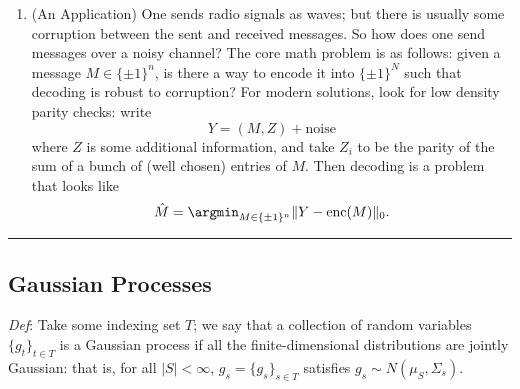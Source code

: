 \begin{enumerate}
  \(A \in \mathbb R^{N \times N}\) with
  \(A_{ij} \sim \mathrm{Ber}(1/2)\), \(A_{ii} = 1\). Then we might ask
  about \[
   \mathbb E \max \{|S| \mid S \subset [N], A_{SS} = \mathbf 1 \}
  \] which we call the largest clique problem (think of \(A\) as a
  random adjacency matrix for a graph). Further, we might care about
  limitations on ``compute'': what can we do in polynomial time?
\item
  (An Application) One sends radio signals as waves; but there is
  usually some corruption between the sent and received messages. So how
  does one send messages over a noisy channel? The core math problem is
  as follows: given a message \(M \in \{\pm 1\}^{n}\), is there a way to
  encode it into \(\{\pm 1\}^{N}\) such that decoding is robust to
  corruption? For modern solutions, look for low density parity checks:
  write \[
   Y = (M, Z) + \mathrm{ noise}
  \] where \(Z\) is some additional information, and take \(Z_{i}\) to
  be the parity of the sum of a bunch of (well chosen) entries of \(M\).
  Then decoding is a problem that looks like \[
   \hat M = \argmin_{M \in \{\pm 1\}^n} \|Y - \mathrm{enc}(M)\|_0.
  \]
\end{enumerate}

\begin{center}\rule{0.5\linewidth}{0.5pt}\end{center}

\subsection{Gaussian Processes}\label{gaussian-processes}

\emph{Def}: Take some indexing set \(T\); we say that a collection of
random variables\(\{g_t\}_{t \in T}\) is a Gaussian process if all the
finite-dimensional distributions are jointly Gaussian: that is, for all
\(|S| < \infty\), \(g_s = \{g_s\}_{s \in T}\) satisfies
\(g_s \sim N(\mu_S, \Sigma_s)\).
